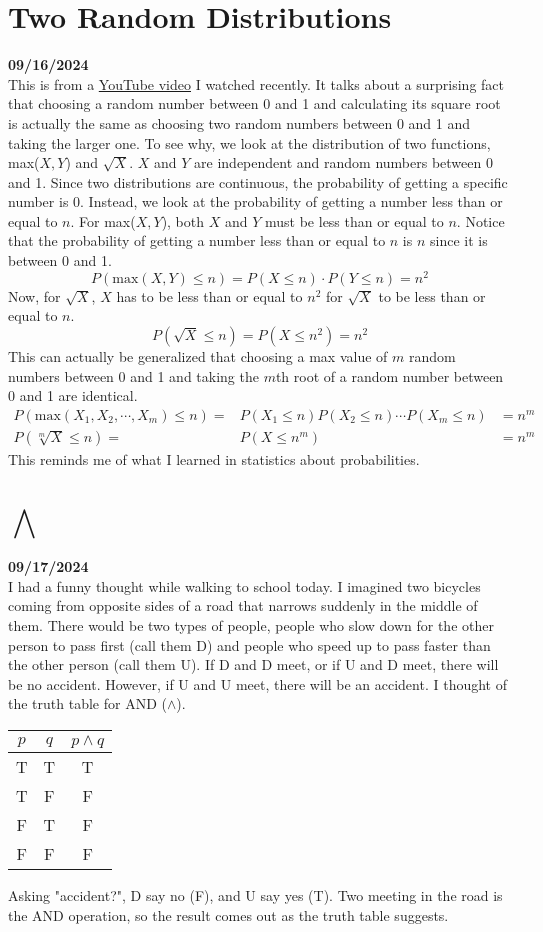 \documentclass[12pt, oneside]{article}
\begin{document}
\section*{Two Random Distributions}
\textbf{09/16/2024}
\\
This is from a \href{https://www.youtube.com/watch?v=ga9Qk38FaHM}{YouTube video} I watched recently. It talks about a surprising fact that choosing a random number between 0 and 1 and calculating its square root is actually the same as choosing two random numbers between 0 and 1 and taking the larger one. To see why, we look at the distribution of two functions, max($X, Y$) and $\sqrt{X}$. $X$ and $Y$ are independent and random numbers between 0 and 1. Since two distributions are continuous, the probability of getting a specific number is 0. Instead, we look at the probability of getting a number less than or equal to $n$. For max($X, Y$), both $X$ and $Y$ must be less than or equal to $n$. Notice that the probability of getting a number less than or equal to $n$ is $n$ since it is between 0 and 1.
\[
P(\text{max}(X, Y) \leq n) = P(X \leq n) \cdot P(Y \leq n) = n^2
\]
Now, for $\sqrt{X}$, $X$ has to be less than or equal to $n^2$ for $\sqrt{X}$ to be less than or equal to $n$.
\[
P(\sqrt{X} \leq n) = P(X \leq n^2) = n^2
\]
This can actually be generalized that choosing a max value of $m$ random numbers between 0 and 1 and taking the $m$th root of a random number between 0 and 1 are identical. 
\begin{eqnarray*}
P(\text{max}(X_1, X_2, \cdots, X_m) \leq n) = & P(X_1 \leq n) P(X_2 \leq n) \cdots P(X_m \leq n) & = n^m\\
P(\sqrt[m]{X} \leq n) = & P(X \leq n^m) & = n^m
\end{eqnarray*}
This reminds me of what I learned in statistics about probabilities.
\section*{$\bigwedge$}
\textbf{09/17/2024}\\

I had a funny thought while walking to school today. I imagined two bicycles coming from opposite sides of a road that narrows suddenly in the middle of them. There would be two types of people, people who slow down for the other person to pass first (call them D) and people who speed up to pass faster than the other person (call them U). If D and D meet, or if U and D meet, there will be no accident. However, if U and U meet, there will be an accident. I thought of the truth table for AND ($\wedge$).
\begin{center}
\begin{tabular} {| c | c | c |}
\hline
$p$ & $q$ & $p \wedge q$\\
\hline
T & T & T\\
\hline
T & F & F\\
\hline
F & T & F\\
\hline
F & F & F\\
\hline
\end{tabular}
\end{center}
Asking "accident?", D say no (F), and U say yes (T). Two meeting in the road is the AND operation, so the result comes out as the truth table suggests.
\end{document}
